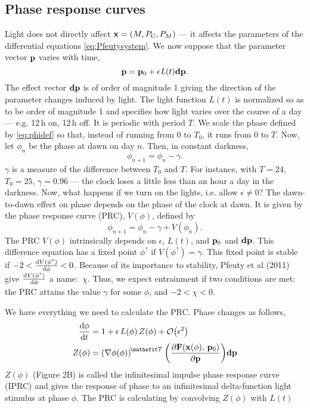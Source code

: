 \subsection{Phase response curves}
Light does not directly affect  $\vb{x}=(M,P_{\text{C}},{P}_{M})$ --- it affects the
parameters of the differential equations \eqref{eq:Pfeutysystem}. We now suppose that the
parameter vector  $\vb{p}$ varies with time,
\begin{equation}
\vb{p}=\vb{p}_{0}+\mathit{\epsilon L}(t)\vb{dp}.
\end{equation}
The effect vector  $\vb{dp}$ is of order of magnitude 1 giving the
direction of the parameter changes induced by light. The light function 
$L(t)$ is normalized so as to be order of magnitude 1 and specifies
how light varies over the course of a day --- e.g. 12\,h on, 12\,h off. It
is periodic with period  $T$. We scale the phase defined by \eqref{eq:phidef} so
that, instead of running from 0 to  ${T}_{0}$, it runs from 0 to 
$T$. Now, let  ${\phi}_{n}$ be the phase at dawn on day  $n$.
Then, in constant darkness,
\begin{equation}
\phi_{n+1}=\phi_{n}-\gamma.
\end{equation}
$\gamma$ is a measure of the difference between  ${T}_{0}$ and  $T$.
For instance, with  $T=24$, ${T}_{0}=25$, $\gamma =0.96$ --- the clock
loses a little less than an hour a day in the darkness. Now, what
happens if we turn on the lights, i.e. allow  $\epsilon\neq0$? The
dawn-to-dawn effect on phase depends on the phase of the clock at
dawn. It is given by the phase response curve (PRC),  $V(\phi)$,
defined by 
\begin{equation}
\phi_{n+1}=\phi_{n}-\gamma +V(\phi_{n}).
\end{equation}
The PRC $V(\phi)$ intrinsically depends on  $\epsilon$,  $L(t)$, and
$\vb{p}_{0}$ and  $\vb{dp}$. This difference equation has a fixed
point  ${\phi}^{?}$ if  $V({\phi}^{?})=\gamma $.
This fixed point is stable if  
$-2<\dv{V(\phi^{*})}{\phi}<0$. 
Because of its importance to stability, Pfeuty et al (2011) give 
$\dv{V(\phi^{*})}{\phi}$ a name:~$\chi$. 
Thus, we expect entrainment if two conditions are met: the PRC attains
the value  $\gamma$ for some  $\phi$, and  $-2<\chi<0$. 


\bigskip
We have everything we need to calculate the PRC. Phase changes as
follows, 
\begin{equation}
\begin{aligned}
\dv{\phi}{t}&=1+\epsilon\,L(\phi)\,Z(\phi)+\order{\epsilon^2}
\\
Z(\phi)&={({\nabla}\phi(\phi))}^{\T}\,
\qty(\pdv{\vb{F}(\vb{x}(\phi),\, \vb{p}_{0})}{\vb{p}})\vb{dp}
\end{aligned}
\end{equation}
$Z(\phi)$ (Figure 2B) is called the infinitesimal impulse phase
response curve (IPRC) and gives the response of phase to an
infinitesimal delta-function light stimulus at phase  $\phi$. The
PRC is calculating by convolving  $Z(\phi)$ with  $L(t)$

